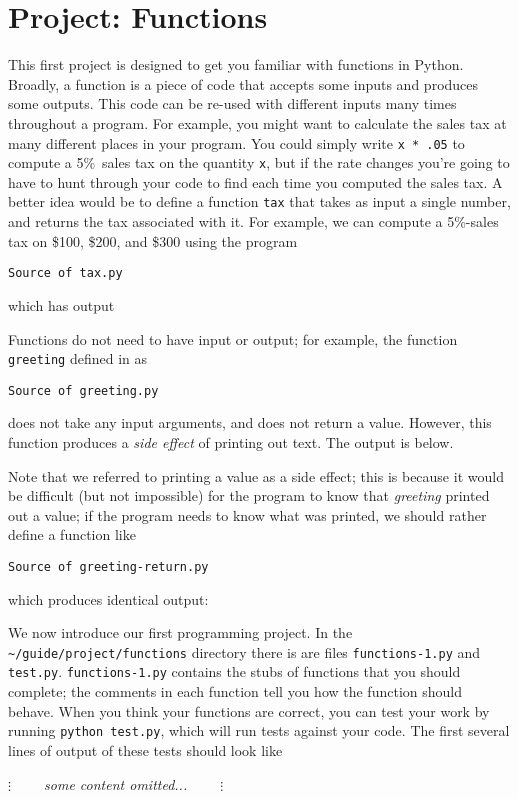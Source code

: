 \documentclass{article}
\newcommand{\example}[1]{%
  \par
  \vspace{.5em}
  \noindent \texttt{Source of #1}
  
  \vspace{.5em}
}
\newcommand{\exampleoutput}[1]{%
  \par
  \vspace{.5em}
  
  \vspace{.5em}
}
\begin{document}
\section{Project: Functions}

This first project is designed to get you familiar with functions in
Python. Broadly, a function is a piece of code that accepts some
inputs and produces some outputs. This code can be re-used with
different inputs many times throughout a program. For example, you
might want to calculate the sales tax at many different places in your
program. You could simply write \texttt{x * .05} to compute a
5\%~sales tax on the quantity \texttt{x}, but if the rate changes
you're going to have to hunt through your code to find each time you
computed the sales tax. A better idea would be to define a function
\texttt{tax} that takes as input a single number, and returns the tax
associated with it. For example, we can compute a 5\%-sales tax on
\$100, \$200, and \$300 using the program
\example{tax.py}
which has output
\exampleoutput{tax.out}
Functions do not need to have input or output; for example, the
function \texttt{greeting} defined in as
\example{greeting.py}
does not take any input arguments, and does not return a
value. However, this function produces a \textit{side effect} of
printing out text. The output is below.
\exampleoutput{greeting.out}
Note that we referred to printing a value as a side effect; this is
because it would be difficult (but not impossible) for the program to
know that \textit{greeting} printed out a value; if the program needs
to know what was printed, we should rather define a function like
\example{greeting-return.py}
which produces identical output:
\exampleoutput{greeting-return.out}

We now introduce our first programming project. In the
\texttt{\~{}/guide/project/functions} directory there is are files
\texttt{functions-1.py} and \texttt{test.py}. \texttt{functions-1.py}
contains the stubs of functions that you should complete; the comments
in each function tell you how the function should behave. When you
think your functions are correct, you can test your work by running
\texttt{python test.py}, which will run tests against your code. The
first several lines of output of these tests should look like

\vspace{.5em}

\hfill \textit{$\vdots\qquad$ some content omitted... $\qquad\vdots$} \hfill
\vspace{.5em}

\end{document}
